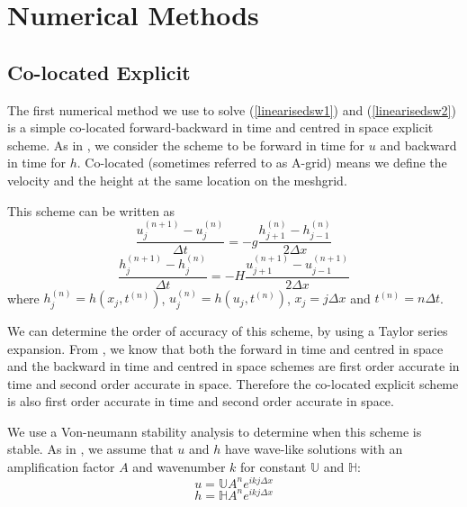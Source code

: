 \documentclass[a4paper, 10.8pt, notitlepage]{article}
\begin{document}
\section{Numerical Methods}\label{numericalmethodssection}

\subsection {Co-located Explicit}
The first numerical method we use to solve (\ref{linearisedsw1}) and (\ref{linearisedsw2}) is a simple co-located forward-backward in time and centred in space explicit scheme. As in \cite{MPE textbook}, we consider the scheme to be forward in time for $u$ and backward in time for $h$. Co-located (sometimes referred to as A-grid) means we define the velocity and the height at the same location on the meshgrid.

This scheme can be written as 
\begin{equation} \label{FTCSAgrid}
\frac{u_{j}^{(n+1)} - u_{j}^{(n)}}{\Delta t} = -g \frac{h_{j+1}^{(n)} - h_{j-1}^{(n)}}{2\Delta x}
\end{equation}
\begin{equation}\label{BTCSAgrid}
\frac{h_{j}^{(n+1)} - h_{j}^{(n)}}{\Delta t} = -H \frac{u_{j+1}^{(n+1)} - u_{j-1}^{(n+1)}}{2\Delta x}
\end{equation}
where $h_{j}^{(n)} = h(x_{j}, t^{(n)})$, $u_{j}^{(n)} = h(u_{j}, t^{(n)})$, $x_{j} = j\Delta x$ and $t^{(n)} = n\Delta t$. 

We can determine the order of accuracy of this scheme, by using a Taylor series expansion. From \cite{MPE textbook}, we know that both the forward in time and centred in space and the backward in time and centred in space schemes are first order accurate in time and second order accurate in space. Therefore the co-located explicit scheme is also first order accurate in time and second order accurate in space.

We use a Von-neumann stability analysis to determine when this scheme is stable. As in \cite{MPE textbook}, we assume that $u$ and $h$ have wave-like solutions with an amplification factor $A$ and wavenumber $k$ for constant $\mathbb{U}$ and $\mathbb{H}$:
\begin{equation} \label{wavelikeu}
u  =  \mathbb{U}  A^{n} e^{ikj\Delta x}
\end{equation}
\begin{equation} \label{wavelikeh}
h  =  \mathbb{H} A^{n} e^{ikj\Delta x}
\end{equation}
\end{document}
